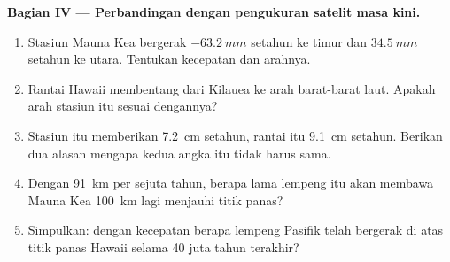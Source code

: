 \begin{problem}
\medskip
\noindent\textbf{Bagian IV --- Perbandingan dengan pengukuran satelit masa kini.}
\begin{enumerate}[resume]
  \item Stasiun Mauna Kea bergerak $\qty{-63.2}{mm}$ setahun ke timur dan
        $\qty{+34.5}{mm}$ setahun ke utara. Tentukan kecepatan dan arahnya.
  \item Rantai Hawaii membentang dari Kilauea ke arah barat-barat laut. Apakah
        arah stasiun itu sesuai dengannya?
  \item Stasiun itu memberikan \qty{7.2}{cm} setahun, rantai itu \qty{9.1}{cm}
        setahun. Berikan dua alasan mengapa kedua angka itu tidak harus sama.
  \item Dengan \qty{91}{km} per sejuta tahun, berapa lama lempeng itu akan
        membawa Mauna Kea \qty{100}{km} lagi menjauhi titik panas?
  \item Simpulkan: dengan kecepatan berapa lempeng Pasifik telah bergerak di
        atas titik panas Hawaii selama 40 juta tahun terakhir?
\end{enumerate}
\end{problem}

